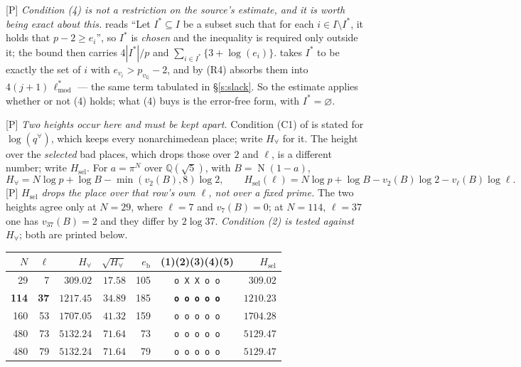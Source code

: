 \documentclass[11pt]{article}
\theoremstyle{plain}
\theoremstyle{definition}
\newcommand{\Norm}{\operatorname{N}}
\begin{document}
\textup{[P]} \emph{Condition (4) is not a restriction on the source's estimate, and it
is worth being exact about this.}  \cite[Prop.~1.4(iii)]{IUT4} reads ``Let
$I^{*}\subseteq I$ be a subset such that for each $i\in I\setminus I^{*}$, it holds that
$p-2\ge e_i$'', so $I^{*}$ is \emph{chosen} and the inequality is required only outside
it; the bound then carries $4|I^{*}|/p$ and $\sum_{i\in I^{*}}\{3+\log(e_i)\}$.
\cite[Thm.~1.10, Step (v)]{IUT4} takes $I^{*}$ to be exactly the set of $i$ with
$e_{v_i}>p_{v_{\mathbb Q}}-2$, and by (R4) absorbs them into
$4(j+1)\,\ell^{*}_{\mathrm{mod}}$ --- the same term tabulated in \S\ref{s:slack}.  So
the estimate applies whether or not (4) holds; what (4) buys is the error-free form,
with $I^{*}=\varnothing$.

\textup{[P]} \emph{Two heights occur here and must be kept apart.}  Condition (C1) of
\cite[Cor.~2.2(ii)]{IUT4} is stated for $\log(q^{\forall})$, which keeps every
nonarchimedean place; write $H_{\forall}$ for it.  The height over the \emph{selected}
bad places, which drops those over $2$ and $\ell$, is a different number; write
$H_{\mathrm{sel}}$.  For $a=\pi^N$ over $\mathbb{Q}(\sqrt5)$, with $B=\Norm(1-a)$,
\[
 H_{\forall}=N\log p+\log B-\min(v_2(B),8)\log2,\qquad
 H_{\mathrm{sel}}(\ell)=N\log p+\log B-v_2(B)\log2-v_\ell(B)\log\ell .
\]
\textup{[P]} \emph{$H_{\mathrm{sel}}$ drops the place over that row's own $\ell$, not
over a fixed prime.}  The two heights agree only at $N=29$, where $\ell=7$ and
$v_7(B)=0$; at $N=114$, $\ell=37$ one has $v_{37}(B)=2$ and they differ by $2\log37$.
\emph{Condition (2) is tested against $H_{\forall}$}; both are printed below.

\begin{center}
\begin{tabular}{rrrrrcr}
\toprule
$N$ & $\ell$ & $H_{\forall}$ & $\sqrt{H_{\forall}}$ & $e_{\mathrm b}$ & (1)(2)(3)(4)(5) & $H_{\mathrm{sel}}$\\
\midrule
29  & 7  & $309.02$  & $17.58$ & 105 & \texttt{o X X o o} & $309.02$\\
\textbf{114} & \textbf{37} & $1217.45$ & $34.89$ & 185 & \texttt{\textbf{o o o o o}} & $1210.23$\\
160 & 53 & $1707.05$ & $41.32$ & 159 & \texttt{o o o o o} & $1704.28$\\
480 & 73 & $5132.24$ & $71.64$ & 73 & \texttt{o o o o o} & $5129.47$\\
480 & 79 & $5132.24$ & $71.64$ & 79 & \texttt{o o o o o} & $5129.47$\\
\bottomrule
\end{tabular}
\end{center}
\end{document}
